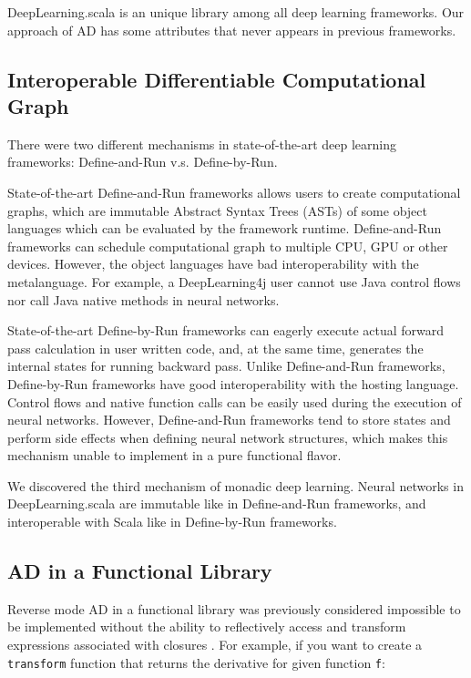 DeepLearning.scala is an unique library among all deep learning frameworks. Our approach of AD has some attributes that never appears in previous frameworks.

\subsection{Interoperable Differentiable Computational Graph}

There were two different mechanisms in state-of-the-art deep learning frameworks:
Define-and-Run v.s. Define-by-Run.

State-of-the-art Define-and-Run frameworks \cite{collobert2008torch,bergstra2010theano,jia2014caffe,chen2015mxnet,abadi2016tensorflow,intel2016bigdl,skymind2017deeplearning4j} allows users to create \glspl{computational graph}, which are immutable Abstract Syntax Trees (ASTs) of some object languages which can be evaluated by the framework runtime. Define-and-Run frameworks can schedule \gls{computational graph} to multiple CPU, GPU or other devices. However, the object languages have bad interoperability with the metalanguage. For example, a DeepLearning4j user cannot use Java control flows nor call Java native methods in neural networks.

State-of-the-art Define-by-Run frameworks \cite{tokui2015chainer,neubig2017dynet,google2017eager,paszke2017pytorch} can eagerly execute actual forward pass calculation in user written code, and, at the same time, generates the internal states for running backward pass. Unlike Define-and-Run frameworks, Define-by-Run frameworks have good interoperability with the hosting language. Control flows and native function calls can be easily used during the execution of neural networks. However, Define-and-Run frameworks tend to store states and perform side effects when defining neural network structures, which makes this mechanism unable to implement in a pure functional flavor.

We discovered the third mechanism of monadic deep learning. Neural networks in DeepLearning.scala are immutable like in Define-and-Run frameworks, and interoperable with Scala like in Define-by-Run frameworks.

\subsection{AD in a Functional Library}

Reverse mode AD in a functional library was previously considered impossible to be implemented without the ability to reflectively access and transform expressions associated with closures \cite{pearlmutter2008reverse}. For example, if you want to create a \lstinline{transform} function that returns the derivative for given function \lstinline{f}:

